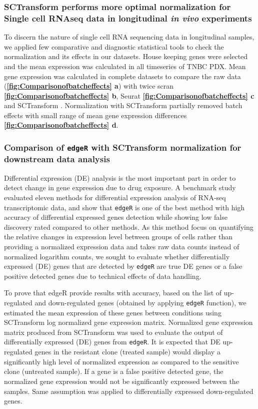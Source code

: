 \subsubsection{SCTransform performs more optimal normalization for Single cell RNAseq data in longitudinal \textit{in vivo} experiments}
 To discern the nature of single cell RNA sequencing data in longitudinal samples, we applied few comparative and diagnostic statistical tools to check the normalization and its effects in our datasets.
 House keeping genes were selected \cite{lin2019evaluating} and the mean expression was calculated in all timeseries of TNBC PDX. Mean gene expression was calculated in complete datasets to compare the raw data (\textbf{\autoref{fig:Comparisonofbatcheffects} a}) with twice scran \cite{lun2016pooling} \textbf{\autoref{fig:Comparisonofbatcheffects} b}, Seurat \cite{butler2018integrating} \textbf{\autoref{fig:Comparisonofbatcheffects} c} and SCTransform \cite{hafemeister2019normalization}. Normalization with SCTransform partially removed batch effects with small range of mean gene expression differences \textbf{\autoref{fig:Comparisonofbatcheffects} d}.

\subsubsection{Comparison of \texttt{edgeR} with SCTransform normalization for downstream data analysis}
Differential expression (DE) analysis is the most important part in order to detect change in gene expression due to drug exposure. A benchmark study evaluated eleven methods \cite{soneson2013comparison} for differential expression analysis of RNA-seq transcriptomic data, and show that \texttt{edgeR} is one of the best method with high accuracy of differential expressed genes detection while showing low false discovery rated compared to other methods. As this method focus on quantifying the relative changes in expression level between groups of cells rather than providing a normalized expression data and takes raw data counts instead of normalized logarithm counts, we sought to evaluate whether differentially expressed (DE) genes that are detected by \texttt{edgeR} are true DE genes or a false positive detected genes due to technical effects of data handling.

To prove that edgeR provide results with accuracy, based on the list of up-regulated and down-regulated genes (obtained by applying \texttt{edgeR} function), we estimated the mean expression of these genes between conditions using SCTransform log normalized gene expression matrix. Normalized gene expression matrix produced from SCTransform was used to evaluate the output of differentially expressed (DE) genes from \texttt{edgeR}. It is expected that DE up-regulated genes in the resistant clone (treated sample) would display a significantly high level of normalized expression as compared to the sensitive clone (untreated sample). If a gene is a false positive detected gene, the normalized gene expression would not be significantly expressed between the samples. Same assumption was applied to differentially expressed down-regulated genes. 

